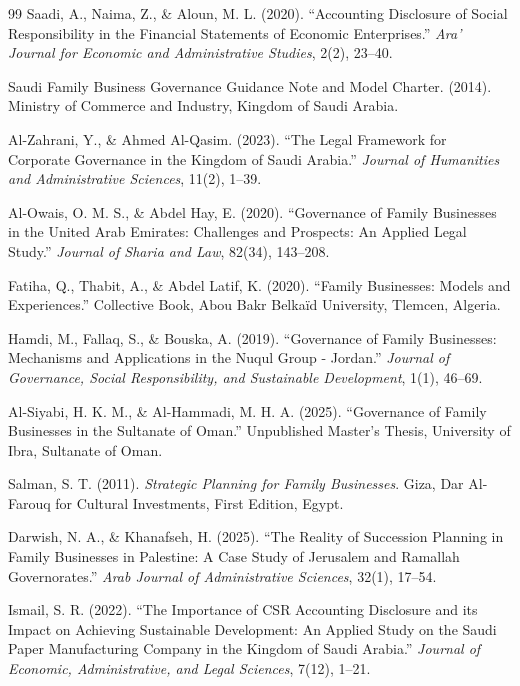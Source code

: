 \documentclass[10pt]{NSP1}
\begin{document}
\begin{thebibliography}{99}
Saadi, A., Naima, Z., \& Aloun, M. L. (2020). ``Accounting Disclosure of Social Responsibility in the Financial Statements of Economic Enterprises.'' \emph{Ara' Journal for Economic and Administrative Studies}, 2(2), 23--40.

Saudi Family Business Governance Guidance Note and Model Charter. (2014). Ministry of Commerce and Industry, Kingdom of Saudi Arabia.

Al-Zahrani, Y., \& Ahmed Al-Qasim. (2023). ``The Legal Framework for Corporate Governance in the Kingdom of Saudi Arabia.'' \emph{Journal of Humanities and Administrative Sciences}, 11(2), 1--39.

Al-Owais, O. M. S., \& Abdel Hay, E. (2020). ``Governance of Family Businesses in the United Arab Emirates: Challenges and Prospects: An Applied Legal Study.'' \emph{Journal of Sharia and Law}, 82(34), 143--208.

Fatiha, Q., Thabit, A., \& Abdel Latif, K. (2020). ``Family Businesses: Models and Experiences.'' Collective Book, Abou Bakr Belkaïd University, Tlemcen, Algeria.

Hamdi, M., Fallaq, S., \& Bouska, A. (2019). ``Governance of Family Businesses: Mechanisms and Applications in the Nuqul Group - Jordan.'' \emph{Journal of Governance, Social Responsibility, and Sustainable Development}, 1(1), 46--69.

Al-Siyabi, H. K. M., \& Al-Hammadi, M. H. A. (2025). ``Governance of Family Businesses in the Sultanate of Oman.'' Unpublished Master's Thesis, University of Ibra, Sultanate of Oman.

Salman, S. T. (2011). \emph{Strategic Planning for Family Businesses}. Giza, Dar Al-Farouq for Cultural Investments, First Edition, Egypt.

Darwish, N. A., \& Khanafseh, H. (2025). ``The Reality of Succession Planning in Family Businesses in Palestine: A Case Study of Jerusalem and Ramallah Governorates.'' \emph{Arab Journal of Administrative Sciences}, 32(1), 17--54.

Ismail, S. R. (2022). ``The Importance of CSR Accounting Disclosure and its Impact on Achieving Sustainable Development: An Applied Study on the Saudi Paper Manufacturing Company in the Kingdom of Saudi Arabia.'' \emph{Journal of Economic, Administrative, and Legal Sciences}, 7(12), 1--21.


\end{thebibliography}
\end{document}
